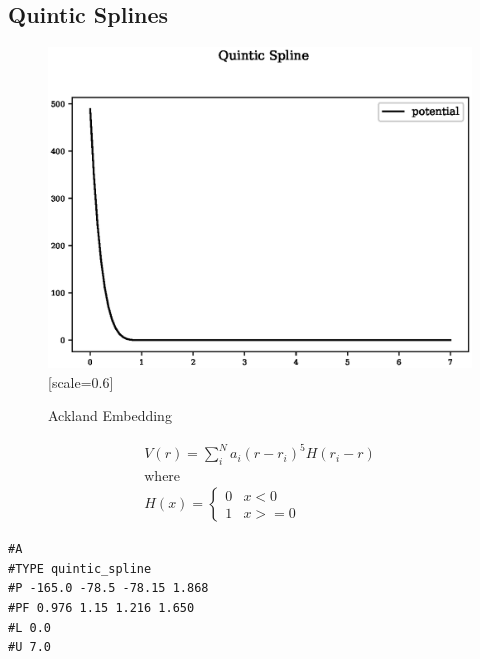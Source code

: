 \documentclass[12pt,twoside]{manual}
\begin{document}
\begin{appendices}
\subsection{Quintic Splines}

\begin{figure}[h]
  \begin{center}
    \includegraphics{img/plots/quintic_spline.eps}[scale=0.6]
    \caption{Ackland Embedding}
    \label{graph:graph1}
  \end{center}
\end{figure}

\begin{equation}
\begin{split}
V(r) = \sum_i^N a_i (r - r_i)^5 H(r_i - r) \\
\text{where } \\
H(x) = \left\{ \begin{matrix} 0 & x<0 \\  1 & x >= 0 \end{matrix} \right . 
\end{split}
\label{eq:quinticSpline}
\end{equation}

\begin{lstlisting}[style=pseudocode,caption={Quintic Splines}]
#A
#TYPE quintic_spline
#P -165.0 -78.5 -78.15 1.868
#PF 0.976 1.15 1.216 1.650
#L 0.0
#U 7.0
\end{lstlisting}





















\end{appendices}








\printbibliography
\end{document}
